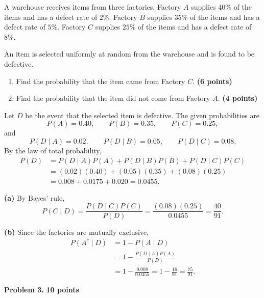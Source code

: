 \documentclass[11pt]{article}
\begin{document}
A warehouse receives items from three factories. Factory $A$ supplies $40\%$ of the items and has a defect rate of $2\%$. Factory $B$ supplies $35\%$ of the items and has a defect rate of $5\%$. Factory $C$ supplies $25\%$ of the items and has a defect rate of $8\%$.

An item is selected uniformly at random from the warehouse and is found to be defective. 
\begin{enumerate}[label=(\alph*),leftmargin=*,itemsep=0.7em]
    \item Find the probability that the item came from Factory $C$. \hfill \textbf{(6 points)}
    \item Find the probability that the item did not come from Factory $A$. \hfill \textbf{(4 points)}
\end{enumerate}

 







\begin{solutionbox}
Let $D$ be the event that the selected item is defective. The given probabilities are
\[
P(A)=0.40,\qquad P(B)=0.35,\qquad P(C)=0.25,
\]
and
\[
P(D\mid A)=0.02,\qquad P(D\mid B)=0.05,\qquad P(D\mid C)=0.08.
\]
By the law of total probability,
\begin{align*}
P(D)
&=P(D\mid A)P(A)+P(D\mid B)P(B)+P(D\mid C)P(C)\\
&=(0.02)(0.40)+(0.05)(0.35)+(0.08)(0.25)\\
&=0.008+0.0175+0.020=0.0455.
\end{align*}

\textbf{(a)} By Bayes' rule,
\[
P(C\mid D)=\frac{P(D\mid C)P(C)}{P(D)}
=\frac{(0.08)(0.25)}{0.0455}
=\frac{40}{91}.
\]

\textbf{(b)} Since the factories are mutually exclusive,
\begin{align*}
P(A^c\mid D)
&=1-P(A\mid D)\\
&=1-\frac{P(D\mid A)P(A)}{P(D)}\\
&=1-\frac{0.008}{0.0455}
=1-\frac{16}{91}
=\frac{75}{91}.
\end{align*}
 
\end{solutionbox}

\newpage
\begin{problemheader}
\textbf{Problem 3.  } \hfill \textbf{10 points}
\end{problemheader}
\end{document}
